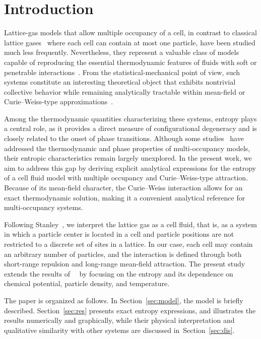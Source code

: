 \documentclass[entropy,article,submit,pdftex,moreauthors]{Definitions/mdpi}
\begin{document}

\section{Introduction}

Lattice-gas models that allow multiple occupancy of a cell, in contrast to classical lattice gases~\citep{LY52,Stanley71} where each cell can contain at most one particle, have been studied much less frequently. Nevertheless, they represent a valuable class of models capable of reproducing the essential thermodynamic features of fluids with soft or penetrable interactions~\citep{Stillinger76,LWL98,FHL04,FL18,LYZ21}. From the statistical-mechanical point of view, such systems constitute an interesting theoretical object that exhibits nontrivial collective behavior while remaining analytically tractable within mean-field or Curie–Weiss-type approximations~\citep{KKD20,KD22}.

Among the thermodynamic quantities characterizing these systems, entropy plays a central role, as it provides a direct measure of configurational degeneracy and is closely related to the onset of phase transitions. Although some studies~\citep{dOG78,FHL04,Prestipino14,PGT15,FL18,LYZ21,KD22} have addressed the thermodynamic and phase properties of multi-occupancy models, their entropic characteristics remain largely unexplored. In the present work, we aim to address this gap by deriving explicit analytical expressions for the entropy of a cell fluid model with multiple occupancy and Curie–Weiss-type attraction. Because of its mean-field character, the Curie–Weiss interaction allows for an exact thermodynamic solution, making it a convenient analytical reference for multi-occupancy systems.

Following Stanley~\citep[Appendix A]{Stanley71}, we interpret the lattice gas as a cell fluid, that is, as a system in which a particle center is located in a cell and particle positions are not restricted to a discrete set of sites in a lattice. In our case, each cell may contain an arbitrary number of particles, and the  interaction is defined through both short-range repulsion and long-range mean-field attraction. The present study extends the results of~~\citep{KKD20,KD22,RDKPS25arxiv} by focusing on the entropy and its dependence on chemical potential, particle density, and temperature.

The paper is organized as follows. In Section~\ref{sec:model}, the model is briefly described. Section~\ref{sec:res} presents exact entropy expressions, and illustrates the results numerically and graphically, while their physical interpretation and qualitative similarity with other systems are discussed in~Section~\ref{sec:dis}.
\end{document}
